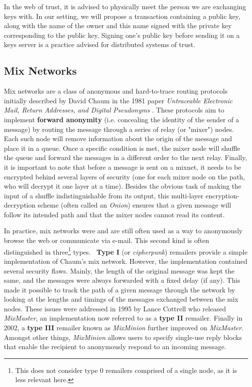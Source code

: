 \documentclass[11pt, a4paper]{article}
\begin{document}
        In the web of trust, it is advised to physically meet the person we are exchanging keys with.
        In our setting, we will propose a transaction containing a public key, along with the name of the owner and this name signed with the private key corresponding to the public key.
        Signing one's public key before sending it on a keys server is a practice advised for distributed systems of trust.

    \subsection{Mix Networks}

        Mix networks are a class of anonymous and hard-to-trace routing protocols initially described by David Chaum in the 1981 paper \textit{Untraceable Electronic Mail, Return Addresses, and Digital Pseudonyms} \cite{chaum84}.
        These protocols aim to implement \textbf{forward anonymity} (i.e. concealing the identity of the sender of a message) by routing the message through a series of relay (or "mixer") nodes.
        Each such node will remove information about the origin of the message and place it in a queue.
        Once a specific condition is met, the mixer node will shuffle the queue and forward the messages in a different order to the next relay.
        Finally, it is important to note that before a message is sent on a mixnet, it needs to be encrypted behind several layers of security (one for each mixer node on the path, who will decrypt it one layer at a time).
        Besides the obvious task of making the input of a shuffle indistinguishable from its output, this multi-layer encryption-decryption scheme (often called an \textit{Onion}) ensures that a given message will follow its intended path and that the mixer nodes cannot read its content.

        In practice, mix networks were and are still often used as a way to anonymously browse the web or communicate via e-mail.
        This second kind is often distinguished in three\footnote{This does not consider type 0 remailers comprised of a single node, as it is less relevant here.} types. \
        \textbf{Type I} (or \textit{cipherpunk}) remailers provide a simple implementation of Chaum's mix network.
        However, the implementation contained several security flaws.
        Mainly, the length of the original message was kept the same, and the messages were always forwarded with a fixed delay (if any).
        This made it possible to track the path of a given message through the network by looking at the lengths and timings of the messages exchanged between the mix nodes.
        These issues were addressed in 1995 by Lance Cottrell who released \textit{MixMaster}, an implementation now referred to as a \textbf{type II} remailer.
        Finally in 2002, a \textbf{type III} remailer known as \textit{MixMinion} \cite{mixminion} further improved on \textit{MixMaster}.
        Amongst other things, \textit{MixMinion} allows users to specify single-use reply blocks that enable the recipient to anonymously respond to an incoming message.
\end{document}
